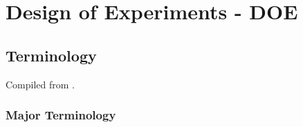 \chapter{Design of Experiments - DOE}

\section{Terminology}
Compiled from \cite{natrella_nist/sematech_2010}.

\subsection{Major Terminology}




